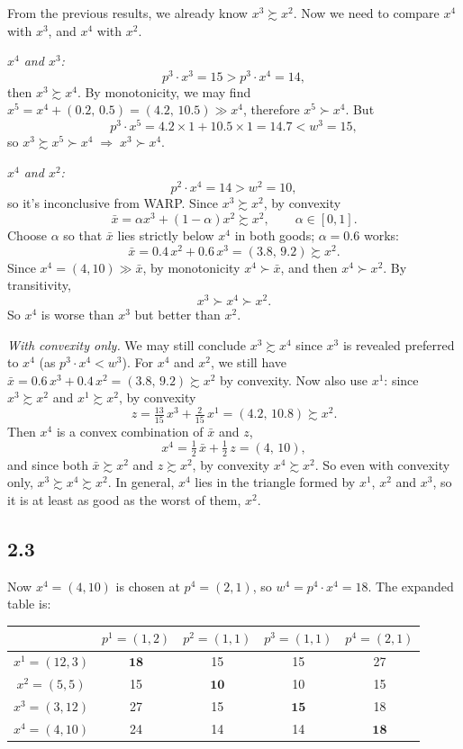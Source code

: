 \documentclass[12pt,letterpaper]{article}
\begin{document}
From the previous results, we already know $x^3 \succsim x^2$. Now we need to compare $x^4$ with $x^3$, and $x^4$ with $x^2$.

\textit{$x^4$ and $x^3$:}
\[
p^3\cdot x^3 = 15 > p^3\cdot x^4 = 14,
\]
then $x^3 \succsim x^4$. By monotonicity, we may find $x^5 = x^4 + (0.2,\,0.5) = (4.2,\,10.5) \gg x^4$, therefore $x^5 \succ x^4$. But
\[
p^3\cdot x^5 = 4.2\times 1 + 10.5\times 1 = 14.7 < w^3 = 15,
\]
so $x^3 \succsim x^5 \succ x^4 \;\Longrightarrow\; x^3 \succ x^4$.

\textit{$x^4$ and $x^2$:}
\[
p^2\cdot x^4 = 14 > w^2 = 10,
\]
so it's inconclusive from WARP. Since $x^3 \succsim x^2$, by convexity
\[
\bar{x} = \alpha x^3 + (1-\alpha)x^2 \succsim x^2, \qquad \alpha\in[0,1].
\]
Choose $\alpha$ so that $\bar{x}$ lies strictly below $x^4$ in both goods; $\alpha = 0.6$ works:
\[
\bar{x} = 0.4\,x^2 + 0.6\,x^3 = (3.8,\,9.2) \succsim x^2 .
\]
Since $x^4 = (4,10) \gg \bar{x}$, by monotonicity $x^4 \succ \bar{x}$, and then $x^4 \succ x^2$. By transitivity,
\[
x^3 \succ x^4 \succ x^2 .
\]
So $x^4$ is worse than $x^3$ but better than $x^2$.

\textit{With convexity only.} We may still conclude $x^3 \succsim x^4$ since $x^3$ is revealed preferred to $x^4$ (as $p^3\cdot x^4 < w^3$). For $x^4$ and $x^2$, we still have $\bar{x} = 0.6\,x^3 + 0.4\,x^2 = (3.8,\,9.2) \succsim x^2$ by convexity. Now also use $x^1$: since $x^3 \succsim x^2$ and $x^1 \succsim x^2$, by convexity
\[
z = \tfrac{13}{15}\,x^3 + \tfrac{2}{15}\,x^1 = (4.2,\,10.8) \succsim x^2 .
\]
Then $x^4$ is a convex combination of $\bar{x}$ and $z$,
\[
x^4 = \tfrac12\,\bar{x} + \tfrac12\,z = (4,\,10),
\]
and since both $\bar{x}\succsim x^2$ and $z\succsim x^2$, by convexity $x^4 \succsim x^2$. So even with convexity only, $x^3 \succsim x^4 \succsim x^2$. In general, $x^4$ lies in the triangle formed by $x^1$, $x^2$ and $x^3$, so it is at least as good as the worst of them, $x^2$.

\subsection*{2.3}

Now $x^4 = (4,10)$ is chosen at $p^4 = (2,1)$, so $w^4 = p^4\cdot x^4 = 18$. The expanded table is:

\begin{center}
\begin{tabular}{c|cccc}
 & $p^1=(1,2)$ & $p^2=(1,1)$ & $p^3=(1,1)$ & $p^4=(2,1)$ \\ \hline
$x^1=(12,3)$ & $\mathbf{18}$ & 15 & 15 & 27 \\
$x^2=(5,5)$  & 15 & $\mathbf{10}$ & 10 & 15 \\
$x^3=(3,12)$ & 27 & 15 & $\mathbf{15}$ & 18 \\
$x^4=(4,10)$ & 24 & 14 & 14 & $\mathbf{18}$
\end{tabular}
\end{center}
\end{document}

